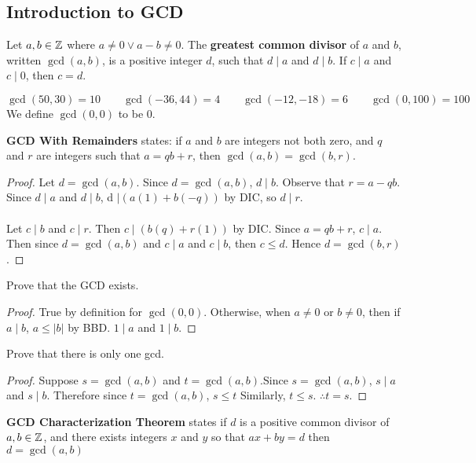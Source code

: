 \documentclass[english, 12pt]{article}
\begin{document}
\subsection{Introduction to GCD}
\begin{defn}
Let $a,b \in {\mathbb{Z}}$ where $a \neq 0 \lor a-b \neq 0$. The \textbf{greatest common divisor} of $a$ and $b$, written $\gcd(a,b)$, is a positive integer $d$, such that $d \mid a$ and $d \mid b$. If $c \mid a$ and $c \mid 0$, then $c = d$.
\end{defn}
\begin{exmp}
\[ \gcd(50,30)=10 \qquad
\gcd(-36,44)=4 \qquad
 \gcd (-12,-18) = 6 \qquad
\gcd (0,100)=100 \qquad\]
We define $\gcd(0,0)$ to be $0$.
\end{exmp}
\begin{thrm}[GCD WR]
\textbf{GCD With Remainders} states: if $a$ and $b$ are integers not both zero, and $q$ and $r$ are integers such that $a = qb+r$, then $\gcd(a,b) = \gcd(b,r)$.
\begin{proof}
Let $d = \gcd(a,b)$. Since $d = \gcd(a,b)$, $d \mid b$. Observe that $r = a - qb$. Since $d \mid a$ and $d \mid b$, d $\mid (a(1) + b(-q))$ by DIC, so $d \mid r$.\\\\
Let $c \mid b$ and $c \mid r$. Then $c \mid (b(q) + r(1))$ by DIC. Since $a = qb+r$, $c \mid a$. Then since $d = \gcd(a,b)$ and $c \mid a$ and $c \mid b$, then $c \leq d$. Hence $d = \gcd(b,r)$.
\end{proof}
\end{thrm}
\begin{exmp}
Prove that the GCD exists.
\begin{proof}
True by definition for $\gcd(0,0)$. Otherwise, when $a \neq 0$ or $b \neq 0$, then if $a \mid b$, $a \leq | b |$ by BBD. $1 \mid a$ and $1 \mid b$.
\end{proof}
\end{exmp}
\begin{exmp}
Prove that there is only one gcd.
\begin{proof}
Suppose $s=\gcd(a,b)$ and $t = \gcd(a,b)$.Since $s=\gcd(a,b)$, $s \mid a$ and $s \mid b$. Therefore since $t = \gcd(a,b)$, $s \leq t$
Similarly, $t \leq s$. $\therefore t = s$.
\end{proof}
\end{exmp}
\begin{thrm}[GCD CT]
\textbf{GCD Characterization Theorem} states if $d$ is a positive common divisor of $a,b \in {\mathbb{Z}}$, and there exists integers $x$ and $y$ so that $ax + by = d$ then $d = \gcd(a,b)$
\end{thrm}
\end{document}
